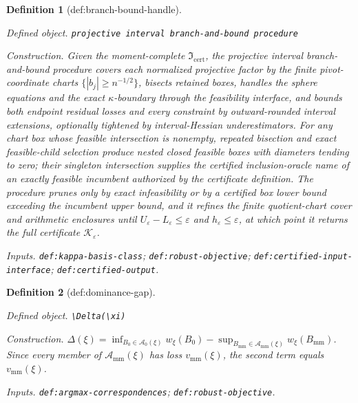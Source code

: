 \documentclass{article}
\newtheorem{definition}{Definition}
\begin{document}
\begin{definition}[def:branch-bound-handle]\label{def:branch-bound-handle}
\par\smallskip\noindent\emph{Defined object.} \texttt{projective interval branch-\allowbreak{}and-\allowbreak{}bound procedure}
\par\smallskip\noindent\emph{Construction.} Given the moment-complete \(\mathfrak I_{\mathrm{cert}}\), the projective interval branch-and-bound procedure covers each normalized projective factor by the finite pivot-coordinate charts \(\{|b_j|\ge n^{-1/2}\}\), bisects retained boxes, handles the sphere equations and the exact \(\kappa\)-boundary through the feasibility interface, and bounds both endpoint residual losses and every constraint by outward-rounded interval extensions, optionally tightened by interval-Hessian underestimators.  For any chart box whose feasible intersection is nonempty, repeated bisection and exact feasible-child selection produce nested closed feasible boxes with diameters tending to zero; their singleton intersection supplies the certified inclusion-oracle name of an exactly feasible incumbent authorized by the certificate definition.  The procedure prunes only by exact infeasibility or by a certified box lower bound exceeding the incumbent upper bound, and it refines the finite quotient-chart cover and arithmetic enclosures until \(U_{\varepsilon}-L_{\varepsilon}\le\varepsilon\) and \(h_{\varepsilon}\le\varepsilon\), at which point it returns the full certificate \(\mathscr K_{\varepsilon}\).
\par\smallskip\noindent\emph{Inputs.} \texttt{def:\allowbreak{}kappa-\allowbreak{}basis-\allowbreak{}class}; \texttt{def:\allowbreak{}robust-\allowbreak{}objective}; \texttt{def:\allowbreak{}certified-\allowbreak{}input-\allowbreak{}interface}; \texttt{def:\allowbreak{}certified-\allowbreak{}output}.
\end{definition}

\begin{definition}[def:dominance-gap]\label{def:dominance-gap}
\par\smallskip\noindent\emph{Defined object.} \texttt{\textbackslash{}\allowbreak{}Delta(\textbackslash{}\allowbreak{}xi)}
\par\smallskip\noindent\emph{Construction.} \(\Delta(\xi)=\inf_{B_0\in\mathcal A_0(\xi)}w_{\xi}(B_0)-\sup_{B_{\mathrm{mm}}\in\mathcal A_{\mathrm{mm}}(\xi)}w_{\xi}(B_{\mathrm{mm}})\).  Since every member of \(\mathcal A_{\mathrm{mm}}(\xi)\) has loss \(v_{\mathrm{mm}}(\xi)\), the second term equals \(v_{\mathrm{mm}}(\xi)\).
\par\smallskip\noindent\emph{Inputs.} \texttt{def:\allowbreak{}argmax-\allowbreak{}correspondences}; \texttt{def:\allowbreak{}robust-\allowbreak{}objective}.
\end{definition}
\end{document}
